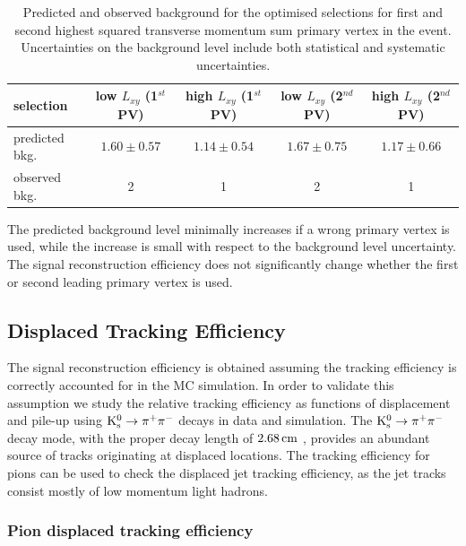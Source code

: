 \begin{table}[htbp]
\caption{Predicted and observed background for the optimised selections for first and second highest squared transverse momentum sum primary vertex in the event. Uncertainties on the background level include both statistical
and systematic uncertainties. \label{tab:wrongvtx}}
\begin{tabular}{lcccc}
\hline
selection & low $L_{xy}$ (1$^{st}$ PV) & high $L_{xy}$ (1$^{st}$ PV) & low $L_{xy}$ (2$^{nd}$ PV) & high $L_{xy}$ (2$^{nd}$ PV)\\
\hline
predicted bkg. & $1.60\pm0.57$ & $1.14\pm0.54$ & $1.67\pm0.75$ & $1.17\pm0.66$ \\
observed bkg. & 2 & 1 & 2 & 1 \\ 
\hline
\end{tabular}
\end{table}

The predicted background level minimally increases if a wrong primary vertex is used, while the increase is small
with respect to the background level uncertainty. The signal reconstruction efficiency 
does not significantly change whether the first or second leading primary vertex is used.

\subsection{Displaced Tracking Efficiency}

The signal reconstruction efficiency is obtained assuming the tracking efficiency is correctly 
accounted for in the MC simulation. In order to validate this assumption we study
the relative tracking efficiency as functions of displacement and pile-up using
$\Kshort \to \pi^+\pi^-$ decays in data and simulation.
The $\Kshort \to \pi^+\pi^-$ decay mode, with the \Kshort proper decay length of $2.68 \,\text{cm}$
 \cite{Beringer:1900zz}, provides an abundant source of tracks originating
at displaced locations. 
The tracking efficiency for \Kshort pions can be used to check the displaced jet tracking efficiency, 
as the jet tracks consist mostly of low momentum light hadrons. 

\subsubsection{Pion displaced tracking efficiency}
\label{subsubsec:pitrkeff}


